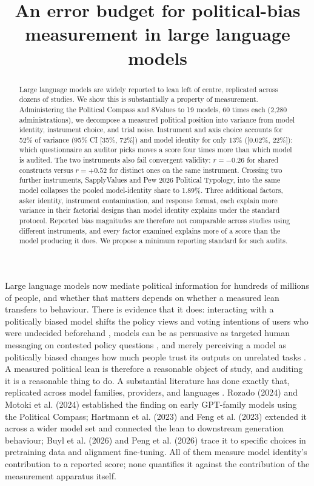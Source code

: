 \documentclass[11pt]{article}
\title{\textbf{An error budget for political-bias measurement in large
language models}}
\author{}
\date{}
\begin{document}
\maketitle

\begin{abstract}
Large language models are widely reported to lean left of centre, replicated
across dozens of studies. We show this is substantially a property of
measurement. Administering the Political Compass and 8Values to 19 models,
60 times each (2,280 administrations), we decompose a measured political
position into variance from model identity, instrument choice, and trial
noise. Instrument and axis choice accounts for 52\% of variance (95\% CI
[35\%, 72\%]) and model identity for only 13\% ([0.02\%, 22\%]): which
questionnaire an auditor picks moves a score four times more than which
model is audited. The two instruments also fail convergent validity:
$r=-0.26$ for shared constructs versus $r=+0.52$ for distinct ones on the
same instrument. Crossing two further instruments, SapplyValues and Pew
2026 Political Typology, into the same model collapses the pooled
model-identity share to 1.89\%. Three additional factors, asker identity,
instrument contamination, and response format, each explain more variance
in their factorial designs than model identity explains under the standard
protocol. Reported bias magnitudes are therefore not comparable across
studies using different instruments, and every factor examined explains
more of a score than the model producing it does. We propose a minimum
reporting standard for such audits.
\end{abstract}

Large language models now mediate political information for hundreds of
millions of people, and whether that matters depends on whether a measured
lean transfers to behaviour. There is evidence that it does: interacting
with a politically biased model shifts the policy views and voting
intentions of users who were undecided beforehand
\citep{fisher2026biasedai}, models can be as persuasive as targeted human
messaging on contested policy questions \citep{bai2025persuade,
hackenburg2025levers}, and merely perceiving a model as politically biased
changes how much people trust its outputs on unrelated tasks
\citep{digiuseppe2026perceived}. A measured political lean is therefore a
reasonable object of study, and auditing it is a reasonable thing to do. A
substantial literature has done exactly that, replicated across model
families, providers, and languages \citep{rozado2024, motoki2024,
hartmann2023, feng2023, buyl2026, peng2026beyond, sakhawat2026polalign}.
Rozado (2024) and Motoki et al.
(2024) established the finding on early GPT-family models using the
Political Compass; Hartmann et al. (2023) and Feng et al. (2023) extended it
across a wider model set and connected the lean to downstream generation
behaviour; Buyl et al. (2026) and Peng et al. (2026) trace it to specific
choices in pretraining data and alignment fine-tuning. All of them measure
model identity's contribution to a reported score; none quantifies it
against the contribution of the measurement apparatus itself.
\end{document}
